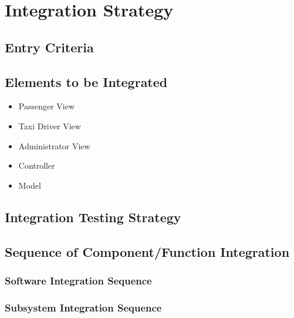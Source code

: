 \section{Integration Strategy}

\subsection{Entry Criteria}

\subsection{Elements to be Integrated}
\begin{itemize}
	\item Passenger View
	\item Taxi Driver View
	\item Administrator View
	\item Controller
	\item Model
\end{itemize}

\subsection{Integration Testing Strategy}

\subsection{Sequence of Component/Function Integration}

\subsubsection{Software Integration Sequence}

\subsubsection{Subsystem Integration Sequence}
